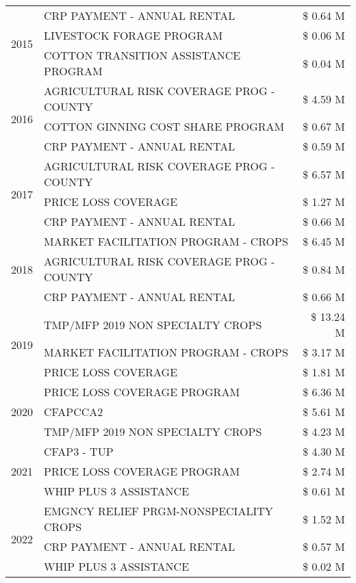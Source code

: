 \begin{tabular}{llr}
\cline{1-3}
\multirow[t]{3}{*}{2015} & CRP PAYMENT - ANNUAL RENTAL & \$ 0.64 M \\
 & LIVESTOCK FORAGE PROGRAM & \$ 0.06 M \\
 & COTTON TRANSITION ASSISTANCE PROGRAM & \$ 0.04 M \\
\cline{1-3}
\multirow[t]{3}{*}{2016} & AGRICULTURAL RISK COVERAGE PROG - COUNTY & \$ 4.59 M \\
 & COTTON GINNING COST SHARE PROGRAM & \$ 0.67 M \\
 & CRP PAYMENT - ANNUAL RENTAL & \$ 0.59 M \\
\cline{1-3}
\multirow[t]{3}{*}{2017} & AGRICULTURAL RISK COVERAGE PROG - COUNTY & \$ 6.57 M \\
 & PRICE LOSS COVERAGE & \$ 1.27 M \\
 & CRP PAYMENT - ANNUAL RENTAL & \$ 0.66 M \\
\cline{1-3}
\multirow[t]{3}{*}{2018} & MARKET FACILITATION PROGRAM - CROPS & \$ 6.45 M \\
 & AGRICULTURAL RISK COVERAGE PROG - COUNTY & \$ 0.84 M \\
 & CRP PAYMENT - ANNUAL RENTAL & \$ 0.66 M \\
\cline{1-3}
\multirow[t]{3}{*}{2019} & TMP/MFP 2019 NON SPECIALTY CROPS & \$ 13.24 M \\
 & MARKET FACILITATION PROGRAM - CROPS & \$ 3.17 M \\
 & PRICE LOSS COVERAGE & \$ 1.81 M \\
\cline{1-3}
\multirow[t]{3}{*}{2020} & PRICE LOSS COVERAGE PROGRAM & \$ 6.36 M \\
 & CFAPCCA2 & \$ 5.61 M \\
 & TMP/MFP 2019 NON SPECIALTY CROPS & \$ 4.23 M \\
\cline{1-3}
\multirow[t]{3}{*}{2021} & CFAP3 - TUP & \$ 4.30 M \\
 & PRICE LOSS COVERAGE PROGRAM & \$ 2.74 M \\
 & WHIP PLUS 3 ASSISTANCE & \$ 0.61 M \\
\cline{1-3}
\multirow[t]{3}{*}{2022} & EMGNCY RELIEF PRGM-NONSPECIALITY CROPS & \$ 1.52 M \\
 & CRP PAYMENT - ANNUAL RENTAL & \$ 0.57 M \\
 & WHIP PLUS 3 ASSISTANCE & \$ 0.02 M \\
\cline{1-3}
\bottomrule
\end{tabular}
